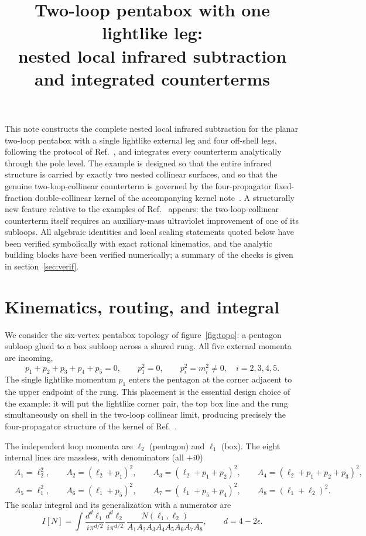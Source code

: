 \documentclass[11pt]{article}
\title{Two-loop pentabox with one lightlike leg:\\ nested local infrared subtraction and integrated counterterms}
\author{}
\date{}
\newcommand{\eps}{\epsilon}
\begin{document}
\maketitle

\noindent
This note constructs the complete nested local infrared subtraction for the planar two-loop pentabox
with a single lightlike external leg and four off-shell legs, following the protocol of
Ref.~\cite{AS}, and integrates every counterterm analytically through the pole level.
The example is designed so that the entire infrared structure is carried by exactly two nested
collinear surfaces, and so that the genuine two-loop-collinear counterterm is governed by the
four-propagator fixed-fraction double-collinear kernel of the accompanying kernel
note~\cite{kernel}. A structurally new feature relative to the examples of Ref.~\cite{AS} appears:
the two-loop-collinear counterterm itself requires an auxiliary-mass ultraviolet improvement of one
of its subloops. All algebraic identities and local scaling statements quoted below have been
verified symbolically with exact rational kinematics, and the analytic building blocks have been
verified numerically; a summary of the checks is given in section~\ref{sec:verif}.

\section{Kinematics, routing, and integral}
\label{sec:kin}

We consider the six-vertex pentabox topology of figure~\ref{fig:topo}: a pentagon subloop glued to
a box subloop across a shared rung. All five external momenta are incoming,
\begin{equation}
p_1+p_2+p_3+p_4+p_5=0,\qquad
p_1^2=0,\qquad p_i^2=m_i^2\neq 0,\quad i=2,3,4,5 .
\label{eq:extkin}
\end{equation}
The single lightlike momentum $p_1$ enters the pentagon at the corner adjacent to the upper
endpoint of the rung. This placement is the essential design choice of the example: it will put the
lightlike corner pair, the top box line and the rung simultaneously on shell in the two-loop
collinear limit, producing precisely the four-propagator structure of the kernel of
Ref.~\cite{kernel}.

The independent loop momenta are $\ell_2$ (pentagon) and $\ell_1$ (box). The eight internal lines
are massless, with denominators (all $+i0$)
\begin{equation}
\begin{aligned}
&A_1=\ell_2^2, \qquad
A_2=(\ell_2+p_1)^2,\qquad
A_3=(\ell_2+p_1+p_2)^2,\qquad
A_4=(\ell_2+p_1+p_2+p_3)^2,\\[2pt]
&A_5=\ell_1^2,\qquad
A_6=(\ell_1+p_5)^2,\qquad
A_7=(\ell_1+p_5+p_4)^2,\qquad
A_8=(\ell_1+\ell_2)^2 .
\end{aligned}
\label{eq:props}
\end{equation}
The scalar integral and its generalization with a numerator are
\begin{equation}
I[N]=\int\frac{d^d\ell_1}{i\pi^{d/2}}\frac{d^d\ell_2}{i\pi^{d/2}}\,
\frac{N(\ell_1,\ell_2)}{A_1A_2A_3A_4A_5A_6A_7A_8},
\qquad d=4-2\eps .
\label{eq:I}
\end{equation}
\end{document}
